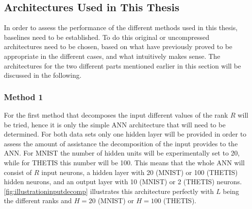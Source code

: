 \subsection{Architectures Used in This Thesis} \label{tex:architectures}
In order to assess the performance of the different methods used in this thesis, baselines need to be established. To do this original or uncompressed architectures need to be chosen, based on what have previously proved to be appropriate in the different cases, and what intuitively makes sense. The architectures for the two different parts mentioned earlier in this section will be discussed in the following.

\subsubsection{Method 1}
For the first method that decomposes the input different values of the rank $R$ will be tried, hence it is only the simple ANN architecture that will need to be determined. For both data sets only one hidden layer will be provided in order to assess the amount of assistance the decomposition of the input provides to the ANN. For MNIST the number of hidden units will be experimentally set to 20, while for THETIS this number will be 100. This means that the whole ANN will consist of $R$ input neurons, a hidden layer with 20 (MNIST) or 100 (THETIS) hidden neurons, and an output layer with 10 (MNIST) or 2 (THETIS) neurons. \autoref{fig:illustrationinputdecomp} illustrates this architecture perfectly with $L$ being the different ranks and $H = 20$ (MNIST) or $H=100$ (THETIS).

